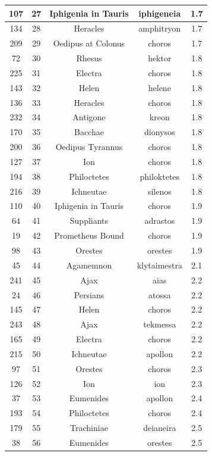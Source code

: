 \documentclass{jcls}
\begin{document}
\begin{longtable}{|c|c|c|c|c|}
  107 & 27 & Iphigenia in Tauris & iphigeneia & 1.7 \\ \hline
  134 & 28 & Heracles & amphitryon & 1.7 \\ \hline
  209 & 29 & Oedipus at Colonus & choros & 1.7 \\ \hline
  72 & 30 & Rhesus & hektor & 1.8 \\ \hline
  225 & 31 & Electra & choros & 1.8 \\ \hline
  143 & 32 & Helen & helene & 1.8 \\ \hline
  136 & 33 & Heracles & choros & 1.8 \\ \hline
  232 & 34 & Antigone & kreon & 1.8 \\ \hline
  170 & 35 & Bacchae & dionysos & 1.8 \\ \hline
  200 & 36 & Oedipus Tyrannus & choros & 1.8 \\ \hline
  127 & 37 & Ion & choros & 1.8 \\ \hline
  194 & 38 & Philoctetes & philoktetes & 1.8 \\ \hline
  216 & 39 & Ichneutae & silenos & 1.8 \\ \hline
  110 & 40 & Iphigenia in Tauris & choros & 1.9 \\ \hline
  64 & 41 & Suppliants & adrastos & 1.9 \\ \hline
  19 & 42 & Prometheus Bound & choros & 1.9 \\ \hline
  98 & 43 & Orestes & orestes & 1.9 \\ \hline
  45 & 44 & Agamemnon & klytaimestra & 2.1 \\ \hline
  241 & 45 & Ajax & aias & 2.2 \\ \hline
  24 & 46 & Persians & atossa & 2.2 \\ \hline
  145 & 47 & Helen & choros & 2.2 \\ \hline
  243 & 48 & Ajax & tekmessa & 2.2 \\ \hline
  165 & 49 & Electra & choros & 2.2 \\ \hline
  215 & 50 & Ichneutae & apollon & 2.2 \\ \hline
  97 & 51 & Orestes & choros & 2.3 \\ \hline
  126 & 52 & Ion & ion & 2.3 \\ \hline
  37 & 53 & Eumenides & apollon & 2.4 \\ \hline
  193 & 54 & Philoctetes & choros & 2.4 \\ \hline
  179 & 55 & Trachiniae & deianeira & 2.5 \\ \hline
  38 & 56 & Eumenides & orestes & 2.5 \\ \hline

\end{longtable}
\end{document}
